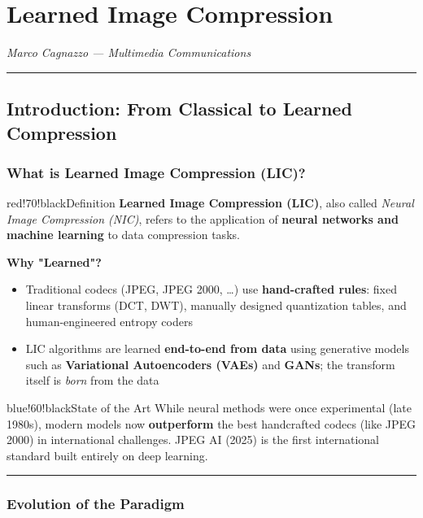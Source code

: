 \chapter{Learned Image Compression}
\textit{Marco Cagnazzo — Multimedia Communications}

\bigskip\hrule\bigskip

\section{Introduction: From Classical to Learned Compression}

\subsection{What is Learned Image Compression (LIC)?}

\begin{calloutbox}{red!70!black}{Definition}
\textbf{Learned Image Compression (LIC)}, also called \textit{Neural Image Compression (NIC)}, refers to the application of \textbf{neural networks and machine learning} to data compression tasks.
\end{calloutbox}

\textbf{Why "Learned"?}
\begin{itemize}
\item Traditional codecs (JPEG, JPEG 2000, …) use \textbf{hand-crafted rules}: fixed linear transforms (DCT, DWT), manually designed quantization tables, and human-engineered entropy coders
\item LIC algorithms are learned \textbf{end-to-end from data} using generative models such as \textbf{Variational Autoencoders (VAEs)} and \textbf{GANs}; the transform itself is \textit{born} from the data
\end{itemize}

\begin{calloutbox}{blue!60!black}{State of the Art}
While neural methods were once experimental (late 1980s), modern models now \textbf{outperform} the best handcrafted codecs (like JPEG 2000) in international challenges. JPEG AI (2025) is the first international standard built entirely on deep learning.
\end{calloutbox}

\bigskip\hrule\bigskip

\subsection{Evolution of the Paradigm}

